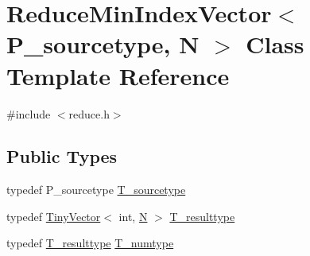 \hypertarget{classReduceMinIndexVector}{}\section{Reduce\+Min\+Index\+Vector$<$ P\+\_\+sourcetype, N $>$ Class Template Reference}
\label{classReduceMinIndexVector}


{\ttfamily \#include $<$reduce.\+h$>$}

\subsection*{Public Types}
\begin{DoxyCompactItemize}
\item 
typedef P\+\_\+sourcetype \hyperlink{classReduceMinIndexVector_a65030b49259be23f83d7a2714e93f502}{T\+\_\+sourcetype}
\item 
typedef \hyperlink{classTinyVector}{Tiny\+Vector}$<$ int, \hyperlink{polmisc_8c_a0240ac851181b84ac374872dc5434ee4}{N} $>$ \hyperlink{classReduceMinIndexVector_a2e7c894a95020e5638affc6f1c8a4e50}{T\+\_\+resulttype}
\item 
typedef \hyperlink{classReduceMinIndexVector_a2e7c894a95020e5638affc6f1c8a4e50}{T\+\_\+resulttype} \hyperlink{classReduceMinIndexVector_af174899864203ff165812b420d848125}{T\+\_\+numtype}
\end{DoxyCompactItemize}
